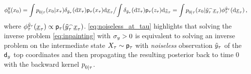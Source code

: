 \begin{equation}
    \label{eq:noiseless_at_tau}
    \filter{0}{\lmeas}{\lstate_0} = {\int \bwtrans{}{0|\tau}{\lstate_\tau}{\lstate_0} \delta_{\tilde\lmeas_\tau}(\rmd \ltopstate_\tau) \bwmarg{\tau}{\lstate_\tau} \rmd \lbottomstate_\tau}\big/{\int \delta_{\tilde\lmeas_\tau}(\rmd \overline{z}_\tau) \bwmarg{\tau}{z_\tau} \rmd \underline{z}_\tau}
    = \int \bwtrans{}{0|\tau}{\cat{{\tilde\lmeas_\tau}}{\lbottomstate_\tau}}{\lstate_0} \filter{\tau}{\tilde\lmeas_\tau}{\rmd \lbottomstate_\tau} \eqsp,
\end{equation}
where $\filter{\tau}{\tilde\lmeas_\tau}{\lbottomstate_\tau} \propto \bwmarg{\tau}{\cat{\tilde\lmeas_\tau}{\lbottomstate_\tau}}$.
\eqref{eq:noiseless_at_tau} highlights that solving the inverse problem \eqref{eq:inpainting} with $\sigma_y > 0$ is equivalent to solving an inverse problem on the intermediate state $\state_{\tau} \sim \bwmarg{\tau}{}$ with \emph{noiseless} observation $\tilde{y}_\tau$ of the $\mathsf{d}_y$ top coordinates and then propagating the resulting posterior back to time $0$ with the backward kernel $\bwtrans{}{0|\tau}{}{}$.
